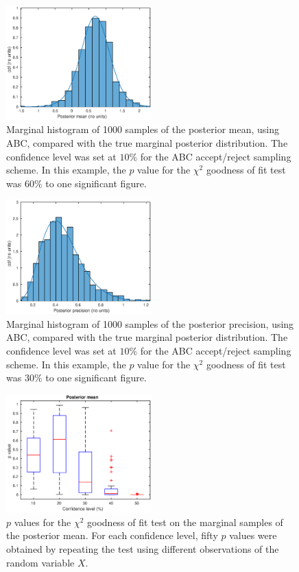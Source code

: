 \documentclass[a4paper,10pt]{article}
\begin{document}
\begin{figure}
\includegraphics[width=0.5\textwidth]{mean.eps}
\caption{Marginal histogram of 1000 samples of the posterior mean, using ABC, compared with the true marginal posterior distribution. The confidence level was set at $10\%$ for the ABC accept/reject sampling scheme. In this example, the $p$ value for the $\chi^2$ goodness of fit test was $60\%$ to one significant figure.}
\label{mean}
\end{figure}

\begin{figure}
\includegraphics[width=0.5\textwidth]{precision.eps}
\caption{Marginal histogram of 1000 samples of the posterior precision, using ABC, compared with the true marginal posterior distribution. The confidence level was set at $10\%$ for the ABC accept/reject sampling scheme. In this example, the $p$ value for the $\chi^2$ goodness of fit test was $30\%$ to one significant figure.}
\label{precision}
\end{figure}

\begin{figure}
\includegraphics[width=0.5\textwidth]{pvalue_mean.eps}
\caption{$p$ values for the $\chi^2$ goodness of fit test on the marginal samples of the posterior mean. For each confidence level, fifty $p$ values were obtained by repeating the test using different observations of the random variable $X$.}
\label{pvalue_mean}
\end{figure}
\end{document}
